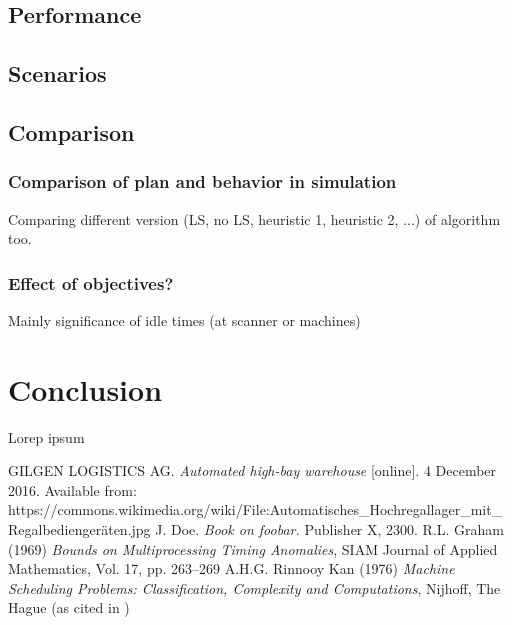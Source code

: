 \documentclass{ctuthesis}
\begin{document}
\section{Performance}
\section{Scenarios}
\section{Comparison}
\subsection{Comparison of plan and behavior in simulation}
Comparing different version (LS, no LS, heuristic 1, heuristic 2, ...) of algorithm too.
\subsection{Effect of objectives?}
Mainly significance of idle times (at scanner or machines)
\chapter{Conclusion}

Lorep ipsum \cite{doe}

\begin{thebibliography}{1}
 GILGEN LOGISTICS AG. \emph{Automated high-bay warehouse} [online]. 4 December 2016. Available from: https://commons.wikimedia.org/wiki/File:Automatisches\_Hochregallager\_mit\_Regalbediengeräten.jpg
 J. Doe. \emph{Book on foobar.} Publisher X,
 2300.
  R.L. Graham (1969) \emph{Bounds on Multiprocessing Timing Anomalies}, SIAM
Journal of Applied Mathematics, Vol. 17, pp. 263–269
 A.H.G. Rinnooy Kan (1976) \emph{Machine Scheduling Problems: Classification,
Complexity and Computations}, Nijhoff, The Hague (as cited in \cite{pinedo})


\end{thebibliography}
\end{document}
